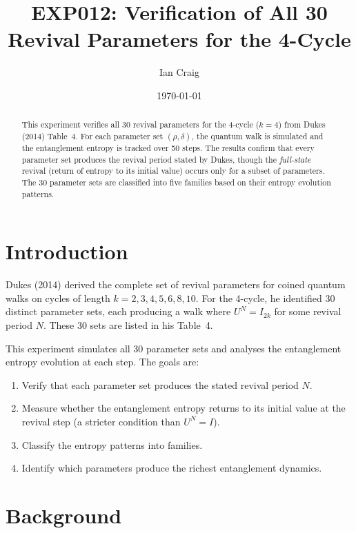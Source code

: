 \documentclass[12pt,a4paper]{article}
\title{EXP012: Verification of All 30 Revival Parameters for the 4-Cycle}
\author{Ian Craig}
\date{\today}
\begin{document}
\maketitle

\begin{abstract}
\noindent
This experiment verifies all 30 revival parameters for the 4-cycle ($k=4$) from Dukes (2014) Table~4. For each parameter set $(\rho, \delta)$, the quantum walk is simulated and the entanglement entropy is tracked over 50 steps. The results confirm that every parameter set produces the revival period stated by Dukes, though the \emph{full-state} revival (return of entropy to its initial value) occurs only for a subset of parameters. The 30 parameter sets are classified into five families based on their entropy evolution patterns.
\end{abstract}

\section{Introduction}

Dukes (2014) \cite{dukes} derived the complete set of revival parameters for coined quantum walks on cycles of length $k = 2,3,4,5,6,8,10$. For the 4-cycle, he identified 30 distinct parameter sets, each producing a walk where $U^N = I_{2k}$ for some revival period $N$. These 30 sets are listed in his Table~4.

This experiment simulates all 30 parameter sets and analyses the entanglement entropy evolution at each step. The goals are:
\begin{enumerate}
    \item Verify that each parameter set produces the stated revival period $N$.
    \item Measure whether the entanglement entropy returns to its initial value at the revival step (a stricter condition than $U^N = I$).
    \item Classify the entropy patterns into families.
    \item Identify which parameters produce the richest entanglement dynamics.
\end{enumerate}

\section{Background}
\end{document}
